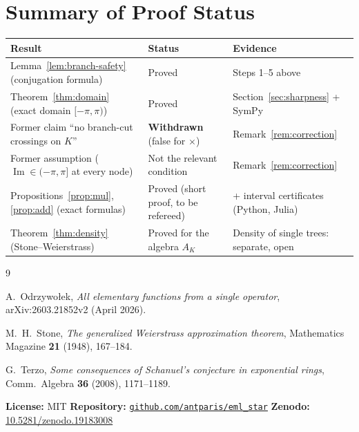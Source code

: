 \documentclass[11pt,a4paper]{article}
\theoremstyle{definition}
\newcommand{\im}{\operatorname{Im}}
\begin{document}
\section*{Summary of Proof Status}

\begin{center}
\begin{tabular}{lll}
\toprule
Result & Status & Evidence \\
\midrule
Lemma~\ref{lem:branch-safety} (conjugation formula) &
  Proved &
  Steps 1--5 above \\
Theorem~\ref{thm:domain} (exact domain $[-\pi,\pi)$) &
  Proved &
  Section~\ref{sec:sharpness} + SymPy \\
Former claim ``no branch-cut crossings on $K$'' &
  \textbf{Withdrawn} (false for $\times$) &
  Remark~\ref{rem:correction} \\
Former assumption ($\im\in(-\pi,\pi]$ at every node) &
  Not the relevant condition &
  Remark~\ref{rem:correction} \\
Propositions~\ref{prop:mul}, \ref{prop:add} (exact formulas) &
  Proved (short proof, to be refereed) &
  + interval certificates (Python, Julia) \\
Theorem~\ref{thm:density} (Stone--Weierstrass) &
  Proved for the algebra $A_K$ &
  Density of single trees: separate, open \\
\bottomrule
\end{tabular}
\end{center}

\begin{thebibliography}{9}

A.~Odrzywołek,
\textit{All elementary functions from a single operator},
arXiv:2603.21852v2 (April 2026).

M.~H.~Stone,
\textit{The generalized Weierstrass approximation theorem},
Mathematics Magazine \textbf{21} (1948), 167--184.

G.~Terzo,
\textit{Some consequences of Schanuel's conjecture in exponential rings},
Comm.\ Algebra \textbf{36} (2008), 1171--1189.

\end{thebibliography}

\bigskip
\noindent\footnotesize
\textbf{License:} MIT\quad
\textbf{Repository:} \href{https://github.com/antparis/eml_star}{\texttt{github.com/antparis/eml\_star}}\quad
\textbf{Zenodo:} \href{https://doi.org/10.5281/zenodo.19183008}{10.5281/zenodo.19183008}
\end{document}
